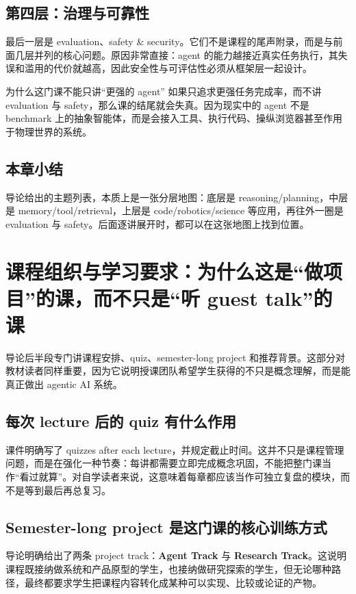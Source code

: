 \documentclass[a4paper]{article}
\begin{document}
\subsection{第四层：治理与可靠性}
最后一层是 evaluation、safety \& security。它们不是课程的尾声附录，而是与前面几层并列的核心问题。原因非常直接：agent 的能力越接近真实任务执行，其失误和滥用的代价就越高，因此安全性与可评估性必须从框架层一起设计。

\begin{warningbox}{为什么这门课不能只讲“更强的 agent”}
如果只追求更强任务完成率，而不讲 evaluation 与 safety，那么课的结尾就会失真。因为现实中的 agent 不是 benchmark 上的抽象智能体，而是会接入工具、执行代码、操纵浏览器甚至作用于物理世界的系统。
\end{warningbox}

\subsection{本章小结}
导论给出的主题列表，本质上是一张分层地图：底层是 reasoning/planning，中层是 memory/tool/retrieval，上层是 code/robotics/science 等应用，再往外一圈是 evaluation 与 safety。后面逐讲展开时，都可以在这张地图上找到位置。

\section{课程组织与学习要求：为什么这是“做项目”的课，而不只是“听 guest talk”的课}
导论后半段专门讲课程安排、quiz、semester-long project 和推荐背景。这部分对教材读者同样重要，因为它说明授课团队希望学生获得的不只是概念理解，而是能真正做出 agentic AI 系统。

\subsection{每次 lecture 后的 quiz 有什么作用}
课件明确写了 quizzes after each lecture，并规定截止时间。这并不只是课程管理问题，而是在强化一种节奏：每讲都需要立即完成概念巩固，不能把整门课当作“看过就算”。对自学读者来说，这意味着每章都应该当作可独立复盘的模块，而不是等到最后再总复习。

\subsection{Semester-long project 是这门课的核心训练方式}
导论明确给出了两条 project track：\textbf{Agent Track} 与 \textbf{Research Track}。这说明课程既接纳做系统和产品原型的学生，也接纳做研究探索的学生，但无论哪种路径，最终都要求学生把课程内容转化成某种可以实现、比较或论证的产物。
\end{document}
